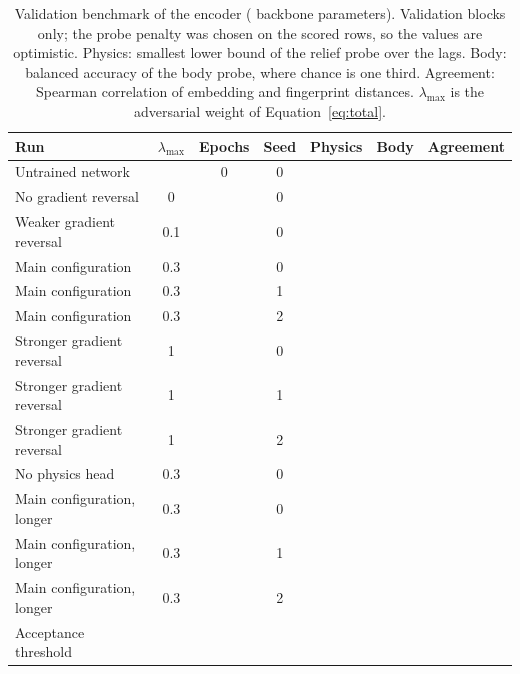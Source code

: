 \begin{table}[tbp]
\centering
\caption{Validation benchmark of the encoder (\ValSweepParams{} backbone parameters). Validation
blocks only; the probe penalty was chosen on the scored rows, so the values are optimistic. Physics:
smallest lower bound of the relief probe \Rsq{} over the lags. Body: balanced accuracy of the body
probe, where chance is one third. Agreement: Spearman correlation of embedding and fingerprint
distances. $\lambda_{\max}$ is the adversarial weight of Equation~\eqref{eq:total}.}
\label{tab:benchmarks}
\footnotesize
\begin{tabular}{@{}lcccccc@{}}
\toprule
Run & $\lambda_{\max}$ & Epochs & Seed & Physics & Body & Agreement \\
\midrule
Untrained network & & 0 & 0 & \ValRandomSPhys{} & \ValRandomSBody{} & \ValRandomSRho{} \\
No gradient reversal & 0 & \TrainEpochs{} & 0 & \ValLamZeroSPhys{} & \ValLamZeroSBody{} & \ValLamZeroSRho{} \\
Weaker gradient reversal & 0.1 & \TrainEpochs{} & 0 & \ValLamTenthSPhys{} & \ValLamTenthSBody{} & \ValLamTenthSRho{} \\
Main configuration & 0.3 & \TrainEpochs{} & 0 & \ValLamThreeSAPhys{} & \ValLamThreeSABody{} & \ValLamThreeSARho{} \\
Main configuration & 0.3 & \TrainEpochs{} & 1 & \ValLamThreeSBPhys{} & \ValLamThreeSBBody{} & \ValLamThreeSBRho{} \\
Main configuration & 0.3 & \TrainEpochs{} & 2 & \ValLamThreeSCPhys{} & \ValLamThreeSCBody{} & \ValLamThreeSCRho{} \\
Stronger gradient reversal & 1 & \TrainEpochs{} & 0 & \ValLamOneSAPhys{} & \ValLamOneSABody{} & \ValLamOneSARho{} \\
Stronger gradient reversal & 1 & \TrainEpochs{} & 1 & \ValLamOneSBPhys{} & \ValLamOneSBBody{} & \ValLamOneSBRho{} \\
Stronger gradient reversal & 1 & \TrainEpochs{} & 2 & \ValLamOneSCPhys{} & \ValLamOneSCBody{} & \ValLamOneSCRho{} \\
No physics head & 0.3 & \TrainEpochs{} & 0 & \ValNoPhysSPhys{} & \ValNoPhysSBody{} & \ValNoPhysSRho{} \\
Main configuration, longer & 0.3 & \ThruMpsFortyEpochs{} & 0 & \ValFortyAPhys{} & \ValFortyABody{} & \ValFortyARho{} \\
Main configuration, longer & 0.3 & \ThruMpsFortyEpochs{} & 1 & \ValFortyBPhys{} & \ValFortyBBody{} & \ValFortyBRho{} \\
Main configuration, longer & 0.3 & \ThruMpsFortyEpochs{} & 2 & \ValFortyCPhys{} & \ValFortyCBody{} & \ValFortyCRho{} \\
\midrule
Acceptance threshold & & & & \GFivePhysRMin{} & \GFiveBodyAccMax{} & \GFiveRhoMin{} \\
\bottomrule
\end{tabular}
\end{table}

